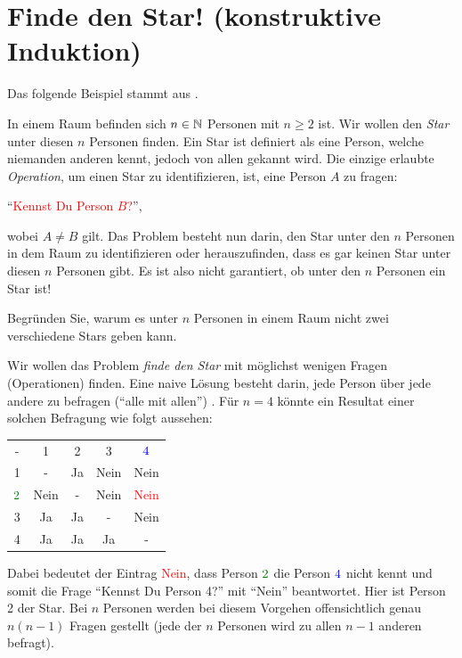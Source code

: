 \section{Finde den Star! (konstruktive Induktion)}
Das folgende Beispiel stammt aus \cite{Datenstrukturen}.

\begin{mydefinition}\label{mydefinition:star}
In einem Raum befinden sich $n\in\mathbb{N}$ Personen mit $n\geq 2$ ist. Wir wollen den \textit{Star} unter diesen $n$ Personen finden. Ein Star ist definiert als eine Person, welche niemanden anderen kennt, jedoch von allen gekannt wird. Die einzige erlaubte \textit{Operation}, um einen Star zu identifizieren, ist, eine Person $A$ zu fragen:
\begin{center}
    \enquote{\textcolor{Red}{Kennst Du Person $B$?}},
\end{center}
wobei $A\neq B$ gilt. Das Problem  besteht nun darin, den Star unter den $n$ Personen in dem Raum zu identifizieren oder herauszufinden, dass es gar keinen Star unter diesen $n$ Personen gibt. Es ist also nicht garantiert, ob unter den $n$ Personen ein Star ist!
\end{mydefinition}

\begin{myexercise}\label{myexercise:0350}
    Begründen Sie, warum es unter $n$ Personen in einem Raum nicht zwei verschiedene Stars geben kann.
\end{myexercise}
\noindent
Wir wollen das Problem \textit{finde den Star} mit möglichst wenigen Fragen (Operationen) finden. Eine naive Lösung besteht darin, jede Person über jede andere zu befragen (\enquote{alle mit allen})
. Für $n=4$ könnte ein Resultat einer solchen Befragung wie folgt aussehen:
\begin{table}[H]
\centering
    \begin{tabular}{ccccc}
    -                                        & 1    & 2  & 3    & $\textcolor{Blue}{4}$   \\
    1                                       & -    & Ja & Nein & Nein                                     \\
    $\textcolor{Green}{2}$ & Nein & -  & Nein & \textcolor{Red}{Nein} \\
    3                                       & Ja   & Ja & -    & Nein                                     \\
    4                                       & Ja   & Ja & Ja   & -                                       
    \end{tabular}
\end{table}
\noindent
Dabei bedeutet der Eintrag \textcolor{Red}{Nein}, dass Person $\textcolor{Green}{2}$ die Person $\textcolor{Blue}{4}$ nicht kennt und somit die Frage \enquote{Kennst Du Person 4?} mit \enquote{Nein} beantwortet. Hier ist Person 2 der Star. Bei $n$ Personen werden bei diesem Vorgehen offensichtlich genau $n(n-1)$ Fragen gestellt (jede der $n$ Personen wird zu allen $n-1$ anderen befragt).

